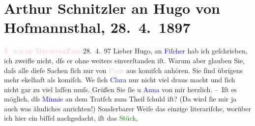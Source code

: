 

               \section[Arthur Schnitzler an Hugo von Hofmannsthal, 28. 4. 1897]{ Arthur Schnitzler an Hugo von Hofmannsthal, 28. 4. 1897}\nopagebreak{}\rehead{ }\normalsize\beginnumbering{} \toendnotes[C]{\smallbreak\pagebreak[2]} 
\toendnotes[C]{\smallbreak}\pstart
           {\pb}\textcolor{pink}{5  \textsc{rue de Maubeuge}}{}\ledrightnote{\textcolor{pink}{rue de Maubeuge}}{\\}\textcolor{pink}{\textsc{Paris}}{}\ledrightnote{\textcolor{pink}{Paris}}{ }28. 4. 97\pend
           \pstart{}Lieber Hugo, \pend\pstart
           an \textcolor{blue}{Fiſcher}{}\ledrightnote{\textcolor{blue}{Samuel Fischer}} hab ich geſchrieben, ich zweifle
                    nicht, dſs er ohne weiters einverſtanden iſt. Warum aber glauben Sie, daſs alle
                    dieſe Sachen ſich nur von \textcolor{pink}{Paris}{}\ledrightnote{\textcolor{pink}{Paris}} aus komiſch
                    anhören. Sie ſind übrigens mehr ekelhaft als komiſch. We{\geminationn}{ }{\pb}ſich \textcolor{blue}{Clara}{}\ledrightnote{\textcolor{blue}{Clara Katharina Pollaczek}} nur
                    nicht viel draus macht und ſich nicht gar zu viel \label{K_L00672_1v}\label{K_L00672_1h}
                    laſſen muſs. Grüßen Sie ſie u \textcolor{blue}{Anna}{}\ledrightnote{\textcolor{blue}{Anna Epstein}} von mir
                    herzlich.\pend
           \pstart
           – Iſt es möglich, dſs \textcolor{blue}{Minnie}{}\ledrightnote{\textcolor{blue}{Hermine von Schaffgotsch}} an dem Tratſch
                    zum Theil ſchuld iſt? (Da wird ſie mir ja auch was ähnliches anrichten!)
                    Sonderbarer Weiſe das einzige literariſche, worüber ich hier ein biſſel
                    nachgedacht, iſt das \textcolor{green}{Stück}{},
